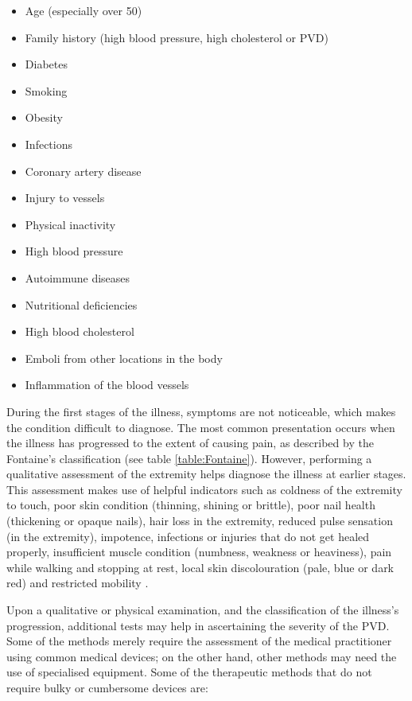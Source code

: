 \begin{itemize}[noitemsep]
	\item Age (especially over \num{50})
	\item Family history (high blood pressure, high cholesterol or PVD)
	\item Diabetes
	\item Smoking
	\item Obesity
	\item Infections
	\item Coronary artery disease
	\item Injury to vessels
	\item Physical inactivity
	\item High blood pressure
	\item Autoimmune diseases
	\item Nutritional deficiencies
	\item High blood cholesterol
	\item Emboli from other locations in the body
	\item Inflammation of the blood vessels
\end{itemize}

During the first stages of the illness, symptoms are not noticeable, which makes the condition difficult to diagnose. The most common presentation occurs when the illness has progressed to the extent of causing pain, as described by the Fontaine's classification (see table \ref{table:Fontaine}). However, performing a qualitative assessment of the extremity helps diagnose the illness at earlier stages. This assessment makes use of helpful indicators such as coldness of the extremity to touch, poor skin condition (thinning, shining or brittle), poor nail health (thickening or opaque nails), hair loss in the extremity, reduced pulse sensation (in the extremity), impotence, infections or injuries that do not get healed properly, insufficient muscle condition (numbness, weakness or heaviness), pain while walking and stopping at rest, local skin discolouration (pale, blue or dark red) and restricted mobility \cite{norgren2007inter, morgan2001developing}.

Upon a qualitative or physical examination, and the classification of the illness's progression, additional tests may help in ascertaining the severity of the PVD. Some of the methods merely require the assessment of the medical practitioner using common medical devices; on the other hand, other methods may need the use of specialised equipment. Some of the therapeutic methods that do not require bulky or cumbersome devices are:

